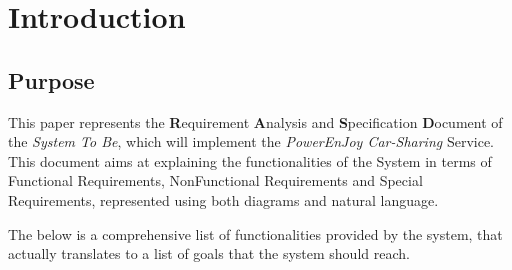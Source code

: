 \section{Introduction}

\subsection{Purpose}
This paper represents the \textbf{R}equirement \textbf{A}nalysis and \textbf{S}pecification \textbf{D}ocument of the \textit{System To Be}, which will implement the \emph{PowerEnJoy Car-Sharing} Service. This document aims at explaining the functionalities of the System in terms of Functional Requirements, NonFunctional Requirements and Special Requirements, represented using both diagrams and natural language.
 
The below is a comprehensive list of functionalities provided by the system, that actually translates to a list of goals that the system should reach.

